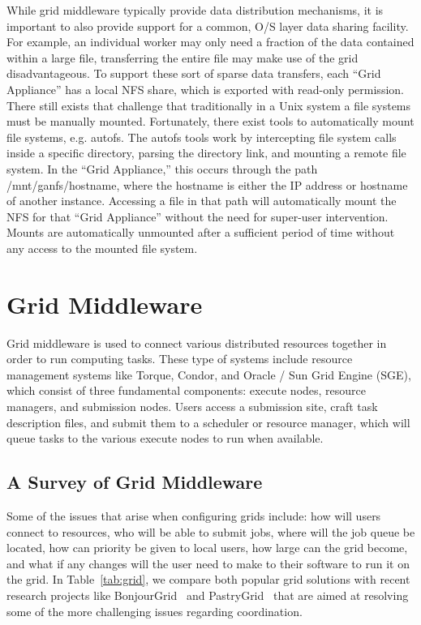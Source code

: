 \documentclass[conference]{IEEEtran}
\begin{document}
While grid middleware typically provide data distribution mechanisms, it is important
to also provide support for a common, O/S layer data sharing facility.  For example, an individual worker may only
need a fraction of the data contained within a large file, transferring the
entire file may make use of the grid disadvantageous.  To support these sort of
sparse data transfers, each ``Grid Appliance'' has a local NFS share, which is
exported with read-only permission.  There still exists that challenge that
traditionally in a Unix system a file systems must be manually mounted.
Fortunately, there exist tools to automatically mount file systems, e.g.
autofs. The autofs tools work by intercepting file system calls inside a specific
directory, parsing the directory link, and mounting a remote file system.  In
the ``Grid Appliance,'' this occurs through the path /mnt/ganfs/hostname, where
the hostname is either the IP address or hostname of another instance.
Accessing a file in that path will automatically mount the NFS for that ``Grid
Appliance'' without the need for super-user intervention.  Mounts are
automatically unmounted after a sufficient period of time without any access to
the mounted file system.  

\section{Grid Middleware}
\label{middleware}

Grid middleware is used to connect various distributed resources together in
order to run computing tasks.  These type of systems include resource
management systems like Torque, Condor, and Oracle / Sun Grid Engine (SGE),
which consist of three fundamental components: execute nodes, resource
managers, and submission nodes.  Users access a submission site, craft task
description files, and submit them to a scheduler or resource manager, which
will queue tasks to the various execute nodes to run when available.

\subsection{A Survey of Grid Middleware}

Some of the issues that arise when configuring grids include:  how will users
connect to resources, who will be able to submit jobs, where will the job queue
be located, how can priority be given to local users, how large can the grid
become, and what if any changes will the user need to make to their software to
run it on the grid.  In Table~\ref{tab:grid}, we compare both popular grid
solutions with recent research projects like BonjourGrid~\cite{bonjourgrid} and
PastryGrid~\cite{pastrygrid} that are aimed at resolving some of the more
challenging issues regarding coordination.
\end{document}
